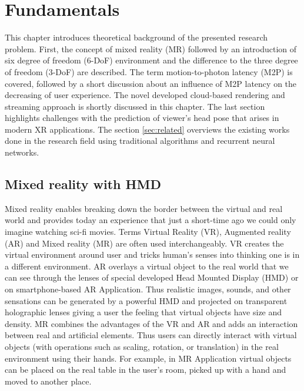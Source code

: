 
\chapter{Fundamentals}
\label{sec:theorie}
This chapter introduces theoretical background of the presented research problem. First, the concept of mixed reality (MR) followed by an introduction of six degree of freedom (6-DoF) environment and the difference to the three degree of freedom (3-DoF) are described. The term motion-to-photon latency (M2P) is covered, followed by a short discussion about an influence of M2P latency on the decreasing of user experience. The novel developed cloud-based rendering and streaming approach is shortly discussed in this chapter. The last section highlights challenges with the prediction of viewer's head pose that arises in modern XR applications. The section \ref{sec:related} overviews the existing works done in the research field using traditional algorithms and recurrent neural networks. 
\section{Mixed reality with HMD}
\label{sec:theorie:ar}
Mixed reality enables breaking down the border between the virtual and real world and provides today an experience that just a short-time ago we could only imagine watching sci-fi movies. Terms Virtual Reality (VR), Augmented reality (AR) and Mixed reality (MR) are often used interchangeably. VR creates the virtual environment around user and tricks human's senses into thinking one is in a different environment. AR overlays a virtual object to the real world that we can see through the lenses of special developed Head Mounted Display (HMD) or on smartphone-based AR Application. Thus realistic images, sounds, and other sensations can be generated by a powerful HMD and projected on transparent holographic lenses giving a user the feeling that virtual objects have size and density. MR combines the advantages of the VR and AR and adds an interaction between real and artificial elements. Thus users can directly interact with virtual objects (with operations such as scaling, rotation, or translation) in the real environment using their hands. For example, in MR Application virtual objects can be placed on the real table in the user's room, picked up with a hand and moved to another place.

